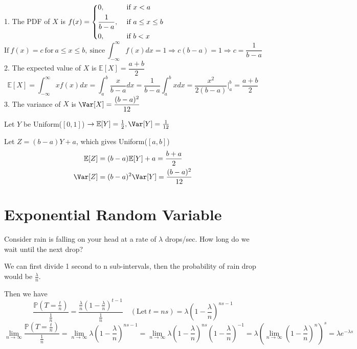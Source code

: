 1. The PDF of \(X\) is \(f(x) = \begin{dcases}
        0, &\text{ if } x < a \\
        \frac{1}{b - a}, &\text{ if } a \leq x \leq b \\
        0 , &\text{ if } b < x
    \end{dcases}\) 
    \[
        \text{If}\ f(x) = c\ \text{for}\ a \leq x \leq b,\ \text{since}\ \int_{-\infty} ^{\infty} f(x)dx = 1 \Rightarrow c(b - a) = 1 \Rightarrow c = \frac{1}{b - a}
    \]
2. The expected value of \(X\) is \(\mathbb{E}[X] = \dfrac{a + b}{2}\)
    \[
        \mathbb{E}[X] = \int_{-\infty} ^{\infty} xf(x)dx = \int_{a} ^{b} \dfrac{x}{b - a}dx = \dfrac{1}{b - a}\int_{a} ^{b} xdx = \dfrac{x^2}{2(b - a)} \Big|_a^b = \dfrac{a + b}{2}
    \]
3. The variance of \(X\) is \(\Var[X] = \dfrac{(b - a)^2}{12}\)
    
    Let \(Y\) be Uniform(\([0, 1]\)) \(\rightarrow \mathbb{E}[Y] = \frac{1}{2}, \Var[Y] = \frac{1}{12}\) 

    Let \(Z = (b - a)Y + a\), which gives Uniform(\([a, b]\)) 
    \[
    \begin{aligned}
        \mathbb{E}[Z] &= (b - a)\mathbb{E}[Y] + a = \dfrac{b + a}{2} \\
        \Var[Z] &= (b - a)^2 \Var[Y] = \dfrac{(b - a)^2}{12}
    \end{aligned}
    \]

\section{Exponential Random Variable}

Consider rain is falling on your head at a rate of \(\lambda\) drops/sec. How long do we wait until the next drop?

We can first divide 1 second to n sub-intervals, then the probability of rain drop would be \(\frac{\lambda}{n}\). 

Then we have 
\[
    \dfrac{\mathbb{P}(T = \frac{t}{n})}{\frac{1}{n}} = \frac{\frac{\lambda}{n}\left(1 - \frac{\lambda}{n}\right)^{t-1}}{\frac{1}{n}} \quad(\text{Let}\ t = ns) = \lambda\left(1 - \dfrac{\lambda}{n}\right)^{ns-1}
\]
\[
    \lim_{n \to \infty} \dfrac{\mathbb{P}(T = \frac{t}{n})}{\frac{1}{n}} = \lim_{n \to \infty} \lambda\left(1 - \dfrac{\lambda}{n}\right)^{ns-1} = \lim_{n \to \infty} \lambda\left(1 - \dfrac{\lambda}{n}\right)^{ns}\left(1 - \dfrac{\lambda}{n}\right)^{-1} = \lambda \left(\lim_{n \to \infty} \left(1 - \dfrac{\lambda}{n}\right)^n\right)^s = \lambda e^{-\lambda s}
\]

